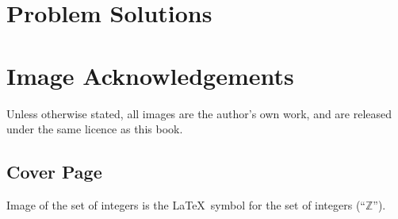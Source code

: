 \chapter{Problem Solutions}

\chapter{Image Acknowledgements}
Unless otherwise stated, all images are the author's own work, and are released under the same licence as this book.

\section{Cover Page}
Image of the set of integers is the \LaTeX\, symbol for the set of integers (``$\mathbb{Z}$'').

\printbibliography[heading=bibintoc, title={References and Bibliography}]
\printindex


